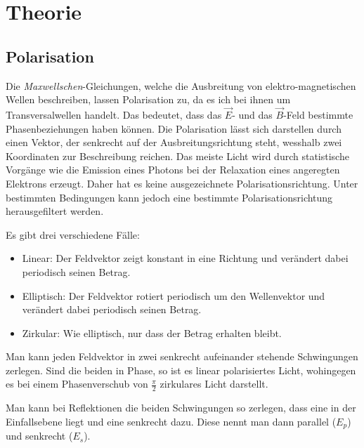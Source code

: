 \documentclass[12pt,a4paper,titlepage,headinclude,bibtotoc]{scrartcl}
\begin{document}
\section{Theorie}
\label{sec:theorie}
\subsection{Polarisation}
Die \textit{Maxwellschen}-Gleichungen, welche die Ausbreitung von elektro-magnetischen Wellen beschreiben, lassen Polarisation zu, da es ich bei ihnen um Transversalwellen handelt.
Das bedeutet, dass das $\vec E$- und das $\vec B$-Feld bestimmte Phasenbeziehungen haben können.
Die Polarisation lässt sich darstellen durch einen Vektor, der senkrecht auf der Ausbreitungsrichtung steht, wesshalb zwei Koordinaten zur Beschreibung reichen.
Das meiste Licht wird durch statistische Vorgänge wie die Emission eines Photons bei der Relaxation eines angeregten Elektrons erzeugt.
Daher hat es keine ausgezeichnete Polarisationsrichtung.
Unter bestimmten Bedingungen kann jedoch eine bestimmte Polarisationsrichtung herausgefiltert werden.

Es gibt drei verschiedene Fälle:
\begin{itemize}
	\item Linear: Der Feldvektor zeigt konstant in eine Richtung und verändert dabei periodisch seinen Betrag.
	\item Elliptisch: Der Feldvektor rotiert periodisch um den Wellenvektor und verändert dabei periodisch seinen Betrag.
	\item Zirkular: Wie elliptisch, nur dass der Betrag erhalten bleibt.
\end{itemize}

Man kann jeden Feldvektor in zwei senkrecht aufeinander stehende Schwingungen zerlegen.
Sind die beiden in Phase, so ist es linear polarisiertes Licht, wohingegen es bei einem Phasenverschub von $\frac{\pi}{2}$ zirkulares Licht darstellt.

Man kann bei Reflektionen die beiden Schwingungen so zerlegen, dass eine in der Einfallsebene liegt und eine senkrecht dazu.
Diese nennt man dann parallel ($E_p$) und senkrecht ($E_s$).
\end{document}
